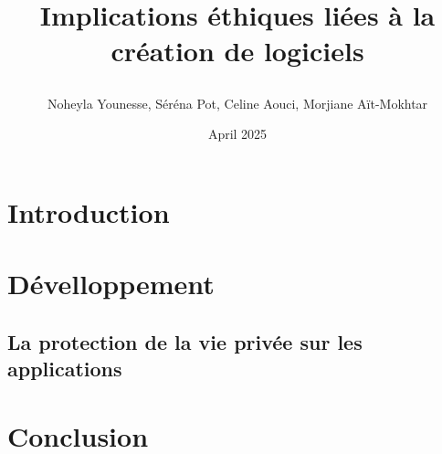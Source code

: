 \documentclass{article}
\title{Implications éthiques liées à la création de logiciels

}
\author{Noheyla Younesse, Séréna Pot, Celine Aouci, Morjiane Aït-Mokhtar}
\date{April 2025}
\begin{document}
\maketitle

\section{Introduction}

\section{Dévelloppement}
\subsection{La protection de la vie privée sur les applications}

\section{Conclusion}
\end{document}
